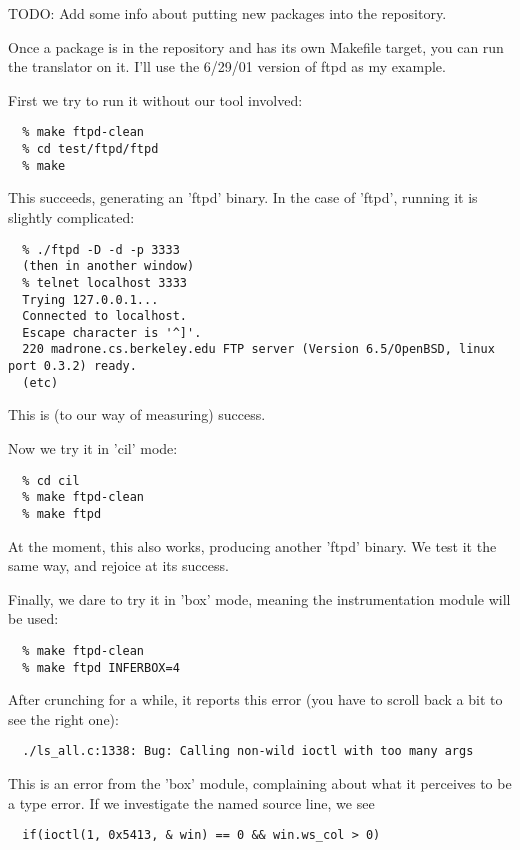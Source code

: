 \documentclass{book}
\begin{document}
TODO: Add some info about putting new packages into the repository.

Once a package is in the repository and has its own Makefile target,
you can run the translator on it.  I'll use the 6/29/01 version of ftpd
as my example.

First we try to run it without our tool involved:

\begin{verbatim}
  % make ftpd-clean
  % cd test/ftpd/ftpd
  % make
\end{verbatim}
  
This succeeds, generating an 'ftpd' binary.  In the case of 'ftpd', 
running it is slightly complicated:

\begin{verbatim}
  % ./ftpd -D -d -p 3333
  (then in another window)
  % telnet localhost 3333
  Trying 127.0.0.1...
  Connected to localhost.
  Escape character is '^]'.
  220 madrone.cs.berkeley.edu FTP server (Version 6.5/OpenBSD, linux port 0.3.2) ready.
  (etc)
\end{verbatim}
  
This is (to our way of measuring) success.

Now we try it in 'cil' mode:

\begin{verbatim}
  % cd cil
  % make ftpd-clean
  % make ftpd
\end{verbatim}
  
At the moment, this also works, producing another 'ftpd' binary.  We test
it the same way, and rejoice at its success.

Finally, we dare to try it in 'box' mode, meaning the instrumentation
module will be used:

\begin{verbatim}
  % make ftpd-clean
  % make ftpd INFERBOX=4
\end{verbatim}
  
After crunching for a while, it reports this error (you have to scroll
back a bit to see the right one):

\begin{verbatim}
  ./ls_all.c:1338: Bug: Calling non-wild ioctl with too many args
\end{verbatim}

This is an error from the 'box' module, complaining about what it
perceives to be a type error.  If we investigate the named source
line, we see

\begin{verbatim}
  if(ioctl(1, 0x5413, & win) == 0 && win.ws_col > 0)
\end{verbatim}
\end{document}
